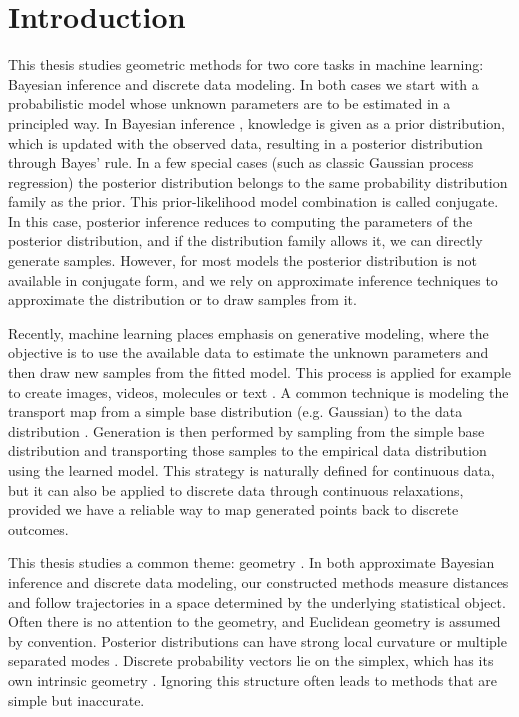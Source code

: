 \chapter{Introduction}
This thesis studies geometric methods for two core tasks in machine learning: Bayesian inference and discrete data modeling.  In both cases we start with a probabilistic model whose unknown parameters are to be estimated in a principled way. In Bayesian inference \citep{gelman1995bayesian}, knowledge is given as a prior distribution, which  is updated with the observed data, resulting in a posterior distribution through Bayes' rule. 
% 
In a few special cases (such as classic Gaussian process regression) the posterior distribution belongs to the same probability distribution family as the prior. 
% 
This prior-likelihood model combination is called conjugate. In this case, posterior inference reduces to computing the parameters of the posterior distribution, and if the distribution family allows it, we can directly generate samples. 
% 
However, for most models the posterior distribution is not available in conjugate form, and we rely on approximate inference techniques to approximate the distribution or to draw samples from it. 


Recently, machine learning places emphasis on generative modeling, where the objective is to use the available data  to estimate the unknown parameters and then draw new  samples from the fitted model. This process is applied for example to create images, videos, molecules or text \citep{lipman2024flowmatchingguidecode}. A common technique is modeling the transport map from a simple base distribution (e.g. Gaussian) to the data distribution \citep{Albergo2023,Lipman2023,liu2023flow}. Generation is then performed by sampling from the simple base distribution and transporting those samples to the empirical data distribution using the learned model. This strategy is naturally defined for continuous data, but it can also be applied to discrete data through continuous relaxations, provided we have a reliable way to map generated points back to discrete outcomes.


This thesis studies a common theme: geometry \citep{amari2000methods,Lee2018}. 
In both approximate Bayesian inference and discrete data modeling, our constructed methods  measure distances and follow trajectories in a space determined by the underlying statistical object. 
Often there is no attention to the geometry, and Euclidean geometry is assumed by convention. Posterior distributions can have strong local curvature \citep{Girolami2011} or multiple separated modes \citep{Lan2014}. Discrete probability vectors lie on the simplex, which has its own intrinsic geometry \citep{Aitchison1986}. Ignoring this structure often leads to methods that are simple but inaccurate.

